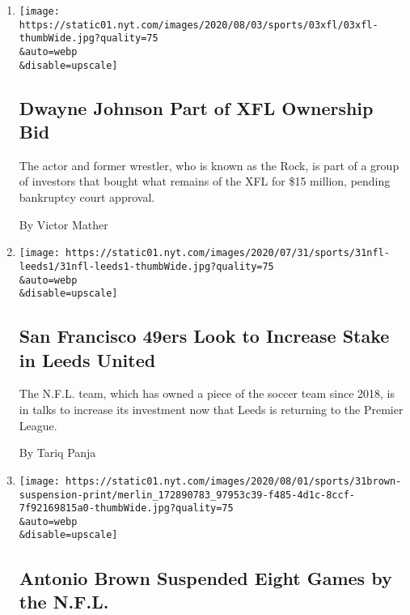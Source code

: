 \begin{enumerate}
\def\labelenumi{\arabic{enumi}.}
\item
  \href{/2020/08/03/sports/football/xfl-the-rock-dwayne-johnson.html}{}

  \texttt{[image: https://static01.nyt.com/images/2020/08/03/sports/03xfl/03xfl-thumbWide.jpg?quality=75\\\&auto=webp\\\&disable=upscale]}

  \hypertarget{dwayne-johnson-part-of-xfl-ownership-bid}{%
  \subsection{Dwayne Johnson Part of XFL Ownership
  Bid}\label{dwayne-johnson-part-of-xfl-ownership-bid}}

  The actor and former wrestler, who is known as the Rock, is part of a
  group of investors that bought what remains of the XFL for \$15
  million, pending bankruptcy court approval.

  By Victor Mather
\item
  \href{/2020/07/31/sports/soccer/leeds-united-san-francisco-49ers.html}{}

  \texttt{[image: https://static01.nyt.com/images/2020/07/31/sports/31nfl-leeds1/31nfl-leeds1-thumbWide.jpg?quality=75\\\&auto=webp\\\&disable=upscale]}

  \hypertarget{san-francisco-49ers-look-to-increase-stake-in-leeds-united}{%
  \subsection{San Francisco 49ers Look to Increase Stake in Leeds
  United}\label{san-francisco-49ers-look-to-increase-stake-in-leeds-united}}

  The N.F.L. team, which has owned a piece of the soccer team since
  2018, is in talks to increase its investment now that Leeds is
  returning to the Premier League.

  By Tariq Panja
\item
  \href{/2020/07/31/sports/football/antonio-brown-suspension-nfl.html}{}

  \texttt{[image: https://static01.nyt.com/images/2020/08/01/sports/31brown-suspension-print/merlin\_172890783\_97953c39-f485-4d1c-8ccf-7f92169815a0-thumbWide.jpg?quality=75\\\&auto=webp\\\&disable=upscale]}

  \hypertarget{antonio-brown-suspended-eight-games-by-the-nfl}{%
  \subsection{Antonio Brown Suspended Eight Games by the
  N.F.L.}\label{antonio-brown-suspended-eight-games-by-the-nfl}}


\end{enumerate}
